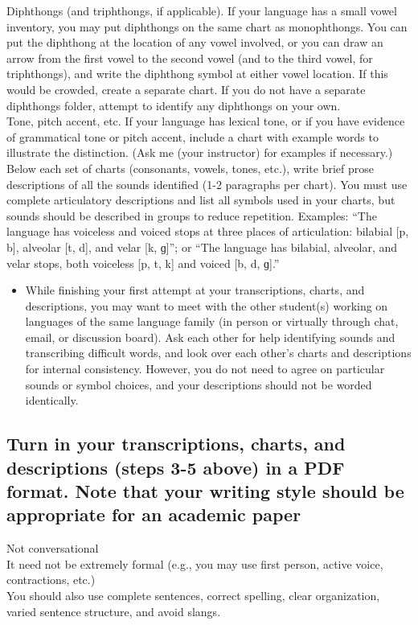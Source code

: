 \documentclass[12pt]{article}
\begin{document}
Diphthongs (and triphthongs, if applicable). If your language has a small vowel inventory, you may put diphthongs on the same chart as monophthongs. You can put the diphthong at the location of any vowel involved, or you can draw an arrow from the first vowel to the second vowel (and to the third vowel, for triphthongs), and write the diphthong symbol at either vowel location. If this would be crowded, create a separate chart. If you do not have a separate diphthongs folder, attempt to identify any diphthongs on your own.\\
Tone, pitch accent, etc.  If your language has lexical tone, or if you have evidence of grammatical tone or pitch accent, include a chart with example words to illustrate the distinction.  (Ask me (your instructor) for examples if necessary.)\\
Below each set of charts (consonants, vowels, tones, etc.), write brief prose descriptions of all the sounds identified (1-2 paragraphs per chart).  You must use complete articulatory descriptions and list all symbols used in your charts, but sounds should be described in groups to reduce repetition.  Examples: “The language has voiceless and voiced stops at three places of articulation: bilabial [p, b], alveolar [t, d], and velar [k, ɡ]”; or “The language has bilabial, alveolar, and velar stops, both voiceless [p, t, k] and voiced [b, d, ɡ].”\\
\begin{itemize}
\item While finishing your first attempt at your transcriptions, charts, and descriptions, you may want to meet with the other student(s) working on languages of the same language family (in person or virtually through chat, email, or discussion board).  Ask each other for help identifying sounds and transcribing difficult words, and look over each other’s charts and descriptions for internal consistency.  However, you do not need to agree on particular sounds or symbol choices, and your descriptions should not be worded identically.
\end{itemize}
\subsection*{Turn in your transcriptions, charts, and descriptions (steps 3-5 above) in a PDF format. Note that your writing style should be appropriate for an academic paper}
Not conversational\\
It need not be extremely formal (e.g., you may use first person, active voice, contractions, etc.)\\
You should also use complete sentences, correct spelling, clear organization, varied sentence structure, and avoid slangs.\\
\end{document}
